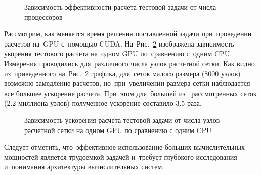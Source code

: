 \begin{figure}[!h]
\begin{center}
\caption{Зависимость эффективности расчета тестовой задачи от числа процессоров}
\label{mpi_eff}
\end{center}
\end{figure}

Рассмотрим, как меняется время решения поставленной задачи при~проведении расчетов на~GPU
с~помощью CUDA. На~Рис.~\ref{cuda_speedup} изображена зависимость укорения тестового расчета на~одном GPU
по~сравнению с~одним CPU. Измерения проводились для~различного числа
узлов расчетной сетки. Как видно из~приведенного на~Рис.~\ref{cuda_speedup}
графика, для~сеток малого размера (8000 узлов) возможно замедление расчетов, но~при~увеличении
размера сетки наблюдается все большее ускорение расчета. При~этом для~большей из~
рассмотренных сеток (2.2 миллиона узлов) полученное ускорение составило 3.5 раза.

\begin{figure}[!h]
\begin{center}
\caption{Зависимость ускорения расчета тестовой задачи от числа узлов расчетной сетки на одном GPU по сравнению с одним CPU}
\label{cuda_speedup}
\end{center}
\end{figure}

Следует отметить, что~эффективное использование больших вычислительных
мощностей является трудоемкой задачей и~требует глубокого исследования и~понимания
архитектуры вычислительных систем.
